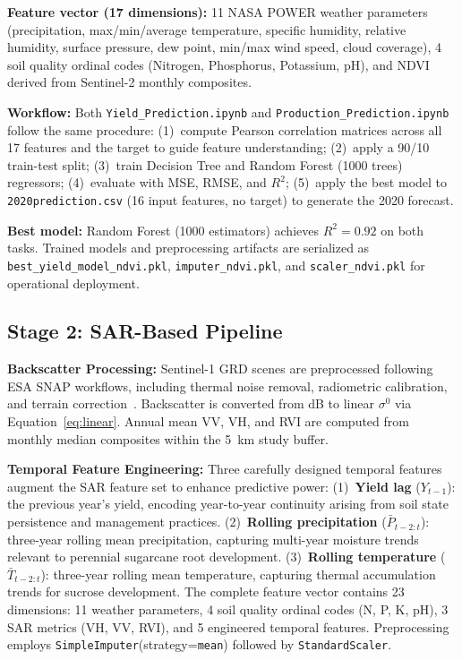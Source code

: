 \documentclass[conference]{IEEEtran}
\begin{document}
\textbf{Feature vector (17 dimensions):} 11 NASA POWER weather parameters
(precipitation, max/min/average temperature, specific humidity, relative
humidity, surface pressure, dew point, min/max wind speed, cloud coverage),
4 soil quality ordinal codes (Nitrogen, Phosphorus, Potassium, pH), and
NDVI derived from Sentinel-2 monthly composites.

\textbf{Workflow:} Both \texttt{Yield\_Prediction.ipynb} and
\texttt{Production\_Prediction.ipynb} follow the same procedure:
(1)~compute Pearson correlation matrices across all 17 features and the target
to guide feature understanding; (2)~apply a 90/10 train-test split;
(3)~train Decision Tree and Random Forest (1000 trees) regressors;
(4)~evaluate with MSE, RMSE, and $R^2$; (5)~apply the best model to
\texttt{2020prediction.csv} (16 input features, no target) to generate the
2020 forecast.

\textbf{Best model:} Random Forest (1000 estimators) achieves $R^2 = 0.92$
on both tasks. Trained models and preprocessing artifacts are serialized as
\texttt{best\_yield\_model\_ndvi.pkl}, \texttt{imputer\_ndvi.pkl}, and
\texttt{scaler\_ndvi.pkl} for operational deployment.

\subsection{Stage 2: SAR-Based Pipeline}

\textbf{Backscatter Processing:} Sentinel-1 GRD scenes are preprocessed
following ESA SNAP workflows, including thermal noise removal, radiometric
calibration, and terrain correction~\cite{esa2022}. Backscatter is converted
from dB to linear $\sigma^0$ via Equation~\eqref{eq:linear}. Annual mean VV,
VH, and RVI are computed from monthly median composites within the
\SI{5}{\kilo\metre} study buffer.

\textbf{Temporal Feature Engineering:} Three carefully designed temporal
features augment the SAR feature set to enhance predictive power:
(1)~\textbf{Yield lag} ($Y_{t-1}$): the previous year's yield, encoding
year-to-year continuity arising from soil state persistence and management
practices. (2)~\textbf{Rolling precipitation}
($\bar{P}_{t-2:t}$): three-year rolling mean precipitation, capturing
multi-year moisture trends relevant to perennial sugarcane root development.
(3)~\textbf{Rolling temperature} ($\bar{T}_{t-2:t}$): three-year rolling mean
temperature, capturing thermal accumulation trends for sucrose development.
The complete feature vector contains 23 dimensions: 11 weather parameters,
4 soil quality ordinal codes (N, P, K, pH), 3 SAR metrics (VH, VV, RVI),
and 5 engineered temporal features. Preprocessing employs
\texttt{SimpleImputer}(strategy=\texttt{mean}) followed by
\texttt{StandardScaler}.
\end{document}
